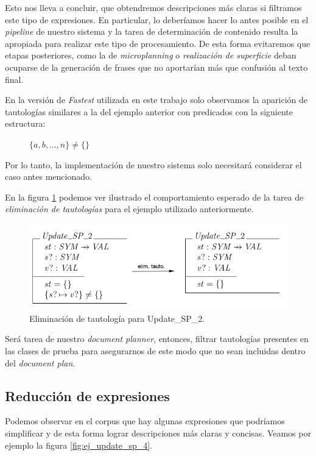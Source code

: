 Esto nos lleva a concluir, que obtendremos descripciones más claras si filtramos este tipo de expresiones. En particular, lo deberíamos hacer lo antes posible en el \textit{pipeline} de nuestro sistema y la tarea de determinación de contenido resulta la apropiada para realizar este tipo de procesamiento. De esta forma evitaremos que etapas posteriores, como la de \emph{microplanning} o \emph{realización de superficie} deban ocuparse de la generación de frases que no aportarían más que confusión al texto final.

En la versión de \emph{Fastest} utilizada en este trabajo solo observamos la aparición de tautologías similares a la del ejemplo anterior con predicados con la siguiente estructura:

\begin{figure}[H]
  \centering
  $\{ a, b, ... , n \} \neq \{ \}$ 
\end{figure}


Por lo tanto, la implementación de nuestro sistema solo necesitará considerar el caso antes mencionado. 

En la figura \ref{fig:ej_elim_tauto} podemos ver ilustrado el comportamiento esperado de la tarea de \emph{eliminación de tautologías} para el ejemplo utilizado anteriormente.

\begin{figure}[H]
  	\centering
	\includegraphics[scale=0.4]{img/ej_elim_tauto.png}
	\caption{Eliminación de tautología para Update\_SP\_2.}
  	\label{fig:ej_elim_tauto}
\end{figure}

Será tarea de nuestro \textit{document planner}, entonces, filtrar tautologías presentes en las clases de prueba para asegurarnos de este modo que no sean  incluidas dentro del \emph{document plan}.

\subsection*{Reducción de expresiones}
Podemos observar en el corpus que hay algunas expresiones que podríamos simplificar y de esta forma lograr descripciones más claras y concisas. Veamos por ejemplo la figura \ref{fig:ej_update_sp_4}.

